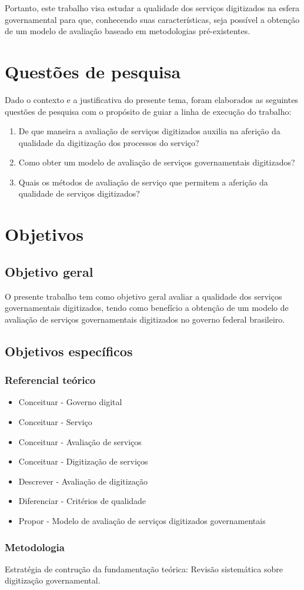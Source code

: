 Portanto, este trabalho visa estudar a qualidade dos serviços digitizados na esfera governamental para que, conhecendo suas características, seja possível a obtenção de um modelo de avaliação baseado em metodologias pré-existentes. 


\section{Questões de pesquisa}

Dado o contexto e a justificativa do presente tema, foram elaborados as seguintes questões de pesquisa com o propósito de guiar a linha de execução do trabalho:\
\begin{enumerate}
	\item De que maneira a avaliação de serviços digitizados auxilia na aferição da qualidade da digitização dos processos do serviço?

	\item Como obter um modelo de avaliação de serviços governamentais digitizados?

	\item Quais os métodos de avaliação de serviço que permitem a aferição da qualidade de serviços digitizados?
\end{enumerate}

\section{Objetivos}
\subsection{Objetivo geral}
	O presente trabalho tem como objetivo geral avaliar a qualidade dos serviços governamentais digitizados, tendo como benefício a obtenção de um modelo de avaliação de serviços governamentais digitizados no governo federal brasileiro.

\subsection{Objetivos específicos}

\subsubsection{Referencial teórico}
\begin{itemize}
\item 	Conceituar - Governo digital
\item	Conceituar - Serviço
\item	Conceituar - Avaliação de serviços
\item	Conceituar - Digitização de serviços
\item	Descrever - Avaliação de digitização
\item	Diferenciar - Critérios de qualidade
\item 	Propor - Modelo de avaliação de serviços digitizados governamentais
\end{itemize}

\subsubsection{Metodologia}
	Estratégia de contrução da fundamentação teórica:
		Revisão sistemática sobre digitização governamental.
